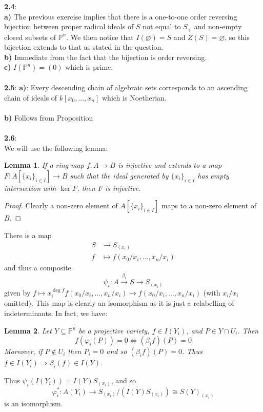 \documentclass[12pt]{article}
\numberwithin{thm}{subsection}
\numberwithin{defn}{subsection}
\newtheorem{lemma}{Lemma}
\numberwithin{lemma}{subsection}
\numberwithin{example}{subsection}
\numberwithin{notation}{subsection}
\numberwithin{cor}{subsection}
\numberwithin{remark}{subsection}
\numberwithin{condition}{subsection}
\numberwithin{question}{subsection}
\numberwithin{construction}{subsection}
\numberwithin{construction}{subsection}
\numberwithin{construction}{subsection}
\newcommand{\bb}[1]{\mathbb{#1}}
\newcommand{\lto}{\longrightarrow}
\begin{document}
%
\textbf{2.4}:\\
\textbf{a)} The previous exercise implies that there is a one-to-one order reversing bijection between proper radical ideals of $S$ not equal to $S_+$ and non-empty closed subsets of $\bb{P}^n$. We then notice that $I(\varnothing) = S$ and $Z(S) = \varnothing$, so this bijection extends to that as stated in the question.\\
\textbf{b)} Immediate from the fact that the bijection is order reversing.\\
\textbf{c)} $I(\bb{P}^n) = (0)$ which is prime.\\\\
%
\textbf{2.5}: 
\textbf{a)}: Every descending chain of algebraic sets corresponds to an ascending chain of ideals of $k[x_0,...,x_n]$ which is Noetherian.\\\\
%
\textbf{b)} Follows from Proposition \cite[\S I 1.5]{hartshorne}\\\\
%
\textbf{2.6}:\\
We will use the following lemma:
\begin{lemma}
\label{lem:indet_map}
If a ring map $f: A \lto B$ is injective and extends to a map $F: A[\lbrace x_i\rbrace_{i \in I}] \lto B$ such that the ideal generated by $\lbrace x_i\rbrace_{i \in I}$ has empty intersection with $\ker{F}$, then $F$ is injective.
\end{lemma}
\begin{proof}
Clearly a non-zero element of $A[\lbrace x_i\rbrace_{i \in I}]$ maps to a non-zero element of $B$.
\end{proof}
There is a map
\begin{align*}
    S &\lto S_{(x_i)}\\
    f &\mapsto f(x_0/x_i,...,x_n/x_i)
\end{align*}
and thus a composite
\[
\psi_i: A \stackrel{\beta_i}{\lto}S\lto S_{(x_i)}
\]
given by $f \mapsto x_i^{\operatorname{deg}f}f(x_0/x_i,...,x_n/x_i) \mapsto f(x_0/x_i,...,x_n/x_i)$ (with $x_i/x_i$ omitted). This map is clearly an isomorphism as it is just a relabelling of indeterminants. In fact, we have:
\begin{lemma}
Let $Y \subseteq \bb{P}^n$ be a projective variety, $f \in I(Y_i)$, and $P \in Y \cap U_i$. Then
\[f(\varphi_i(P)) = 0 \Longleftrightarrow (\beta_i f)(P) = 0\]
Moreover, if $P \not\in U_i$ then $P_i = 0$ and so $(\beta_i f)(P) = 0$. Thus $f \in I(Y_i) \Rightarrow \beta_i(f) \in I(Y)$.
\end{lemma}
Thus $\psi_i(I(Y_i)) = I(Y)S_{(x_i)}$, and so \[\varphi_i^\ast: A(Y_i) \lto S_{(x_i)}/(I(Y)S_{(x_i)}) \cong S(Y)_{(x_i)}\]
    is an isomorphism.
\end{document}
